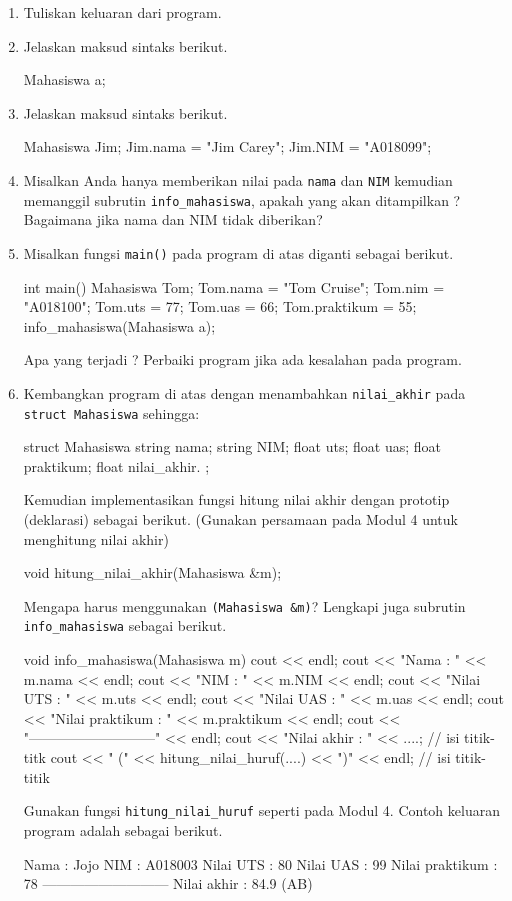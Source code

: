 \documentclass[a4paper,11pt]{extarticle}
\begin{document}
\begin{enumerate}
%
\item Tuliskan keluaran dari program.
%
\item Jelaskan maksud sintaks berikut.
\begin{cppcode}
Mahasiswa a;
\end{cppcode}
%
\item Jelaskan maksud sintaks berikut.
\begin{cppcode}
Mahasiswa Jim;
Jim.nama = "Jim Carey";
Jim.NIM = "A018099";
\end{cppcode}
%
\item Misalkan Anda hanya memberikan nilai pada \texttt{nama} dan \texttt{NIM}
kemudian memanggil
subrutin \texttt{info\_mahasiswa}, apakah yang akan ditampilkan ?
Bagaimana jika nama dan NIM tidak diberikan?
%
\item Misalkan fungsi \texttt{main()} pada program di atas diganti
sebagai berikut.
\begin{cppcode}
int main()
{
  Mahasiswa Tom;
  Tom.nama = "Tom Cruise";
  Tom.nim = "A018100";
  Tom.uts = 77;
  Tom.uas = 66;
  Tom.praktikum = 55;
  info_mahasiswa(Mahasiswa a);
}
\end{cppcode}
Apa yang terjadi ? Perbaiki program jika ada kesalahan pada program.
%
\item Kembangkan program di atas dengan menambahkan \texttt{nilai\_akhir} pada
\texttt{struct Mahasiswa} sehingga:
\begin{cppcode}
struct Mahasiswa
{
  string nama;
  string NIM;
  float uts;
  float uas;
  float praktikum;
  float nilai_akhir.
};
\end{cppcode}
%
Kemudian implementasikan fungsi hitung nilai akhir dengan prototip (deklarasi)
sebagai berikut. (Gunakan persamaan pada Modul 4 untuk menghitung nilai akhir)
\begin{cppcode}
void hitung_nilai_akhir(Mahasiswa &m);
\end{cppcode}
Mengapa harus menggunakan \texttt{(Mahasiswa \&m)}?
%
Lengkapi juga subrutin \texttt{info\_mahasiswa} sebagai berikut.
\begin{cppcode}
void info_mahasiswa(Mahasiswa m)
{
  cout << endl;
  cout << "Nama            : " << m.nama << endl;
  cout << "NIM             : " << m.NIM << endl;
  cout << "Nilai UTS       : " << m.uts << endl;
  cout << "Nilai UAS       : " << m.uas << endl;
  cout << "Nilai praktikum : " << m.praktikum << endl;
  cout << "---------------------------" << endl;
  cout << "Nilai akhir     : " << ....; // isi titik-titk
  cout << " (" << hitung_nilai_huruf(....) << ")" << endl; // isi titik-titik
}
\end{cppcode}
Gunakan fungsi \texttt{hitung\_nilai\_huruf} seperti pada Modul 4.
%
Contoh keluaran program adalah sebagai berikut.
\begin{textcode}
Nama            : Jojo
NIM             : A018003
Nilai UTS       : 80
Nilai UAS       : 99
Nilai praktikum : 78
---------------------------
Nilai akhir     : 84.9 (AB)


\end{textcode}
\end{enumerate}
\end{document}
